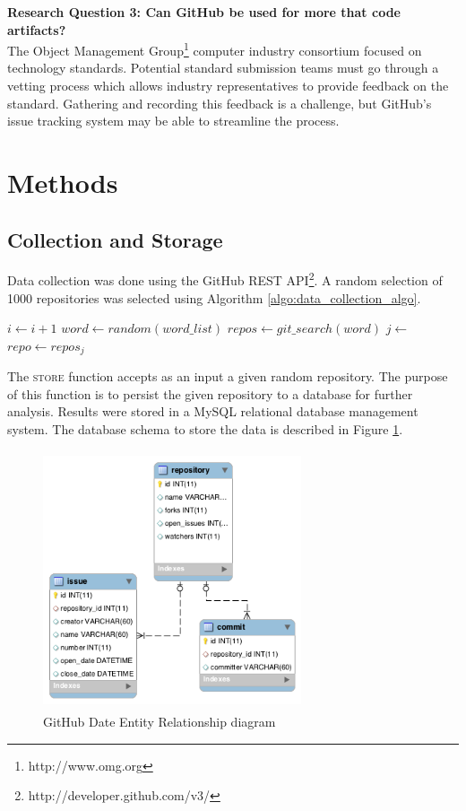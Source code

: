 \documentclass{proc}
\begin{document}
\noindent \textbf{Research Question 3: Can GitHub be used for more that code artifacts?}\\
The Object Management Group\textregistered\footnote{http://www.omg.org} computer industry consortium focused on technology standards. Potential standard submission teams must go through a vetting process\cite{kobryn1999uml} which allows industry representatives to provide feedback on the standard. Gathering and recording this feedback is a challenge, but GitHub's issue tracking system may be able to streamline the process.

\section{Methods}
\subsection{Collection and Storage}
Data collection was done using the GitHub REST API\footnote{http://developer.github.com/v3/}. A random selection of 1000 repositories was selected using Algorithm \ref{algo:data_collection_algo}.

\begin{algorithm}[H]
\label{algo:data_collection_algo}
\begin{algorithmic}[1]
\State $i \gets i + 1$
\State $word \gets random(word\_list)$
\State $repos \gets git\_search(word)$
\State $j \gets $%
\State $repo \gets repos_j$
\State %
\EndWhile
\end{algorithmic}
\end{algorithm}

The \textsc{store} function accepts as an input a given random repository. The purpose of this function is to persist the given repository to a database for further analysis. Results were stored in a MySQL relational database management system. The database schema to store the data is described in Figure \ref{fig:er_diagram}.

\begin{figure}
\includegraphics[height=3in,width=3in]{images/er.png}
\caption{GitHub Date Entity Relationship diagram}
\label{fig:er_diagram}
\end{figure}
\end{document}
